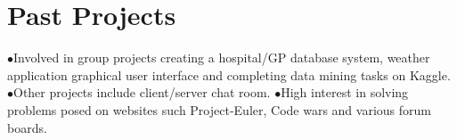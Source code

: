 \section*{Past Projects}

\noindent $\bullet$Involved in group projects creating a hospital/GP database system, weather application graphical user interface and completing data mining tasks on Kaggle. \newline
$\bullet$Other projects include client/server chat room.  \newline
$\bullet$High interest in solving problems posed on websites such Project-Euler, Code wars and various forum boards.   